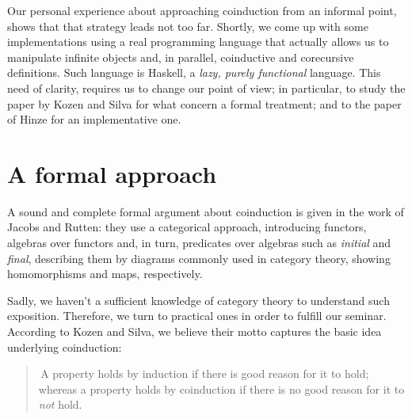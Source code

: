 Our personal experience about approaching coinduction from an informal
point, shows that that strategy leads not too far. 
Shortly, we come up with some implementations
using a real programming language that actually allows us to manipulate
infinite objects and, in parallel, coinductive and corecursive definitions. 
Such language is Haskell, a \emph{lazy, purely functional} language.  
This need of clarity, requires us to change our point of view;
in particular, to study the paper by Kozen and Silva for what concern
a formal treatment; and to the paper of Hinze for an implementative one.

\section{A formal approach}

A sound and complete formal argument about coinduction is given in the
work of Jacobs and Rutten: they use a categorical approach, introducing
functors, algebras over functors and, in turn, predicates over algebras 
such as \emph{initial} and \emph{final}, describing them by diagrams 
commonly used in category theory, showing homomorphisms and maps, 
respectively.

Sadly, we haven't a sufficient knowledge of category theory to understand
such exposition. Therefore, we turn to practical ones in order to fulfill
our seminar. According to Kozen and Silva, we believe their motto captures
the basic idea underlying coinduction:
\begin{quote}
    \guillemotleft\,A property holds by induction if there is good reason for
    it to hold; whereas a property holds by coinduction if there is no good
    reason for it to \emph{not} hold.\guillemotright
\end{quote}

